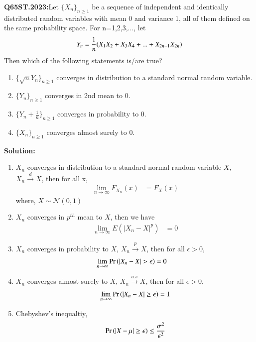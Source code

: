 \documentclass[journal,12pt,Twocolumn]{IEEEtran}
\theoremstyle{remark}
\begin{document}

\textbf{Q65ST.2023:}Let $\{X_n\}_{n \geq 1}$ be a sequence of independent and identically distributed random variables with mean 0 and variance 1, all of them defined on the same
probability space. For n=1,2,3,..., let
\begin{align}
Y_n=\frac{1}{n}{\left(X_1X_2+X_3X_4+...+X_{2n-1}X_{2n}\right)} 
\end{align}
Then which of the following statements is/are true? 
\begin{enumerate}[label=(\Alph*)]
\item $\{\sqrt{n}Y_n\}_{n \geq 1}$ converges in distribution to a standard normal random variable.
\item $\{Y_n\}_{n \geq 1}$ converges in 2nd mean to 0.
\item $\{Y_n+\frac{1}{n}\}_{n \geq 1}$ converges in probability to 0.
\item $\{X_n\}_{n \geq 1}$ converges almost surely to 0.
\end{enumerate}
\textbf{Solution:}\begin{enumerate}
\item $X_n$ converges in distribution to a standard normal random variable $X$, $X_n \xrightarrow{d} X$, then for all x,
\begin{align}
\lim_{n \to \infty} F_{X_n}(x) &= F_X(x)
\end{align}
where, $X \sim \mathcal{N}(0,1)$
\item $X_n$ converges in $p^{th}$ mean to $X$, then we have
\begin{align}
\lim_{n \to \infty} E(|X_n-X|^p)&=0
\end{align}
\item $X_n$ converges in probability to $X$, $X_n \xrightarrow{p} X$, then for all $\epsilon > 0$,
\begin{align}
\lim_{n \to \infty} \pr{|X_n-X|>\epsilon}&=0
\end{align}
\item $X_n$ converges almost surely to $X$, $X_n \xrightarrow{a.s} X$, then for all $\epsilon > 0$,
\begin{align}
\lim_{n \to \infty} \Pr\left(|X_n - X| \geq  \epsilon\right) = 1 
\end{align}
\item Chebyshev's inequaltiy,
\begin{align}
\Pr\left(|X-\mu|\geq \epsilon\right) \leq \frac{\sigma^2}{\epsilon^2}
\end{align}
\end{enumerate}
\end{document}
